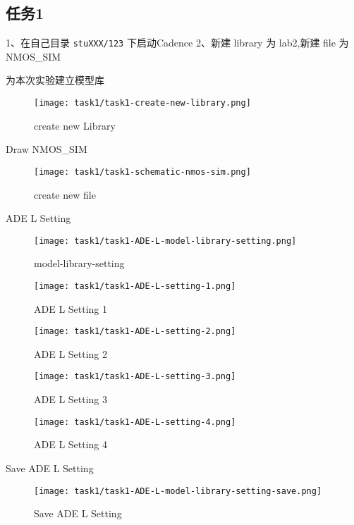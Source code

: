 \documentclass{theme-2614084}
\begin{document}
\subsection{任务1}

1、在自己目录 \texttt{stuXXX/123} 下启动Cadence  
2、新建 library 为 lab2,新建 file 为 NMOS\_SIM

为本次实验建立模型库

\begin{figure}[H]
  \centering
  \texttt{[image: task1/task1-create-new-library.png]}
  \caption{create new Library}
\end{figure}

Draw NMOS\_SIM

\begin{figure}[H]
  \centering
  \texttt{[image: task1/task1-schematic-nmos-sim.png]}
  \caption{create new file}
\end{figure}

ADE L Setting

\begin{figure}[H]
  \centering
  \texttt{[image: task1/task1-ADE-L-model-library-setting.png]}
  \caption{model-library-setting}
\end{figure}

\begin{figure}[H]
  \centering
  \texttt{[image: task1/task1-ADE-L-setting-1.png]}
  \caption{ADE L Setting 1}
\end{figure}

\begin{figure}[H]
  \centering
  \texttt{[image: task1/task1-ADE-L-setting-2.png]}
  \caption{ADE L Setting 2}
\end{figure}

\begin{figure}[H]
  \centering
  \texttt{[image: task1/task1-ADE-L-setting-3.png]}
  \caption{ADE L Setting 3}
\end{figure}

\begin{figure}[H]
  \centering
  \texttt{[image: task1/task1-ADE-L-setting-4.png]}
  \caption{ADE L Setting 4}
\end{figure}

Save ADE L Setting

\begin{figure}[H]
  \centering
  \texttt{[image: task1/task1-ADE-L-model-library-setting-save.png]}
  \caption{Save ADE L Setting}
\end{figure}
\end{document}
